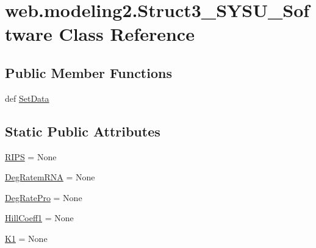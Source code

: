 \hypertarget{classweb_1_1modeling2_1_1_struct3___s_y_s_u___software}{\section{web.\-modeling2.\-Struct3\-\_\-\-S\-Y\-S\-U\-\_\-\-Software Class Reference}
\label{classweb_1_1modeling2_1_1_struct3___s_y_s_u___software}
}
\subsection*{Public Member Functions}
\begin{DoxyCompactItemize}
\item 
def \hyperlink{classweb_1_1modeling2_1_1_struct3___s_y_s_u___software_a073dacebb18a0c3dde4246580f3d8582}{Set\-Data}
\end{DoxyCompactItemize}
\subsection*{Static Public Attributes}
\begin{DoxyCompactItemize}
\item 
\hyperlink{classweb_1_1modeling2_1_1_struct3___s_y_s_u___software_a49b40bf0b1f261c85db16ba9a6fa6886}{R\-I\-P\-S} = None
\item 
\hyperlink{classweb_1_1modeling2_1_1_struct3___s_y_s_u___software_a979d1fc9b875dc36d1a55ecdbb651b36}{Deg\-Ratem\-R\-N\-A} = None
\item 
\hyperlink{classweb_1_1modeling2_1_1_struct3___s_y_s_u___software_af5a786032488c6a4a6381c61e04d1b20}{Deg\-Rate\-Pro} = None
\item 
\hyperlink{classweb_1_1modeling2_1_1_struct3___s_y_s_u___software_a77fa680c60912891c6dbd88edc3d7d5f}{Hill\-Coeff1} = None
\item 
\hyperlink{classweb_1_1modeling2_1_1_struct3___s_y_s_u___software_a859353936f4efcbe3e435714af1a9851}{K1} = None
\end{DoxyCompactItemize}


